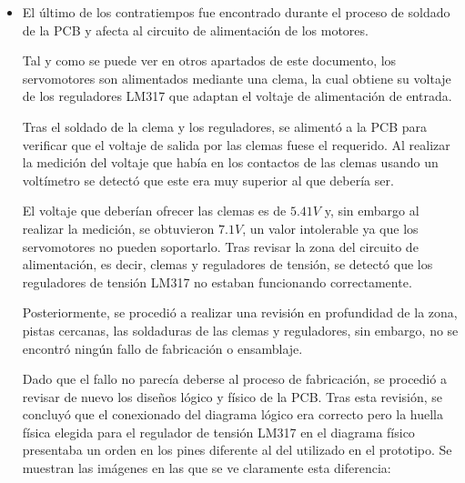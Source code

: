 \begin{itemize}
    \begin{figure}[H]
    \centering 
    \texttt{[image: pictures/SoldaduraPrecisión.jpg]}
    \caption{Soldadura del hilo de reconexión con el nuevo pin.}
    \label{fig:Reconex_Soldadura}
    \end{figure}
    Tal y como se puede observar en las figuras anteriores (imágenes \ref{fig:Reconex} y \ref{fig:Reconex_Soldadura}), el reducido tamaño de la soldadura requirió que este proceso fuese realizado con máxima precisión. Además, por precaución, se eliminó parte de la pista original para evitar errores en la señal.
    
    A pesar de que esta solución es de carácter artesanal y lo recomendable hubiese sido fabricar de nuevo la \ac{PCB}, se tomó la decisión de realizar este arreglo para reducir el impacto del contratiempo en el proyecto, ya que además se comprobó un buen resultado y fue suficientemente segura.
   
   \item El último de los contratiempos fue encontrado durante el proceso de soldado de la \ac{PCB} y afecta al circuito de alimentación de los motores.
   
   Tal y como se puede ver en otros apartados de este documento, los servomotores son alimentados mediante una clema, la cual obtiene su voltaje de los reguladores LM317 que adaptan el voltaje de alimentación de entrada.
   
   Tras el soldado de la clema y los reguladores, se alimentó a la \ac{PCB} para verificar que el voltaje de salida por las clemas fuese el requerido. Al realizar la medición del voltaje que había en los contactos de las clemas usando un voltímetro se detectó que este era muy superior al que debería ser.
   
   El voltaje que deberían ofrecer las clemas es de $5.41V$ y, sin embargo al realizar la medición, se obtuvieron $7.1V$, un valor intolerable ya que los servomotores no pueden soportarlo. Tras revisar la zona del circuito de alimentación, es decir, clemas y reguladores de tensión, se detectó que los reguladores de tensión LM317 no estaban funcionando correctamente.
   
   Posteriormente, se procedió a realizar una revisión en profundidad de la zona, pistas cercanas, las soldaduras de las clemas y reguladores, sin embargo, no se encontró ningún fallo de fabricación o ensamblaje.
   
   Dado que el fallo no parecía deberse al proceso de fabricación, se procedió a revisar de nuevo los diseños lógico y físico de la \ac{PCB}. Tras esta revisión, se concluyó que el conexionado del diagrama lógico era correcto pero la huella física elegida para el regulador de tensión LM317 en el diagrama físico presentaba un orden en los pines diferente al del utilizado en el prototipo. Se muestran las imágenes en las que se ve claramente esta diferencia:
   

\end{itemize}
